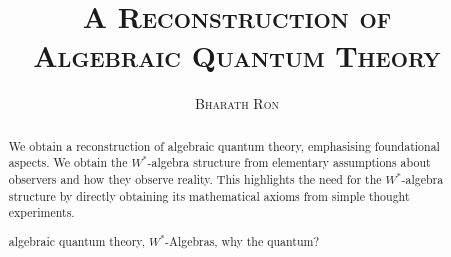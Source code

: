 \documentclass[11pt]{article}
\begin{document}
{\author{\textsc{Bharath Ron}}
\title{{{\LARGE \bfseries \textsc{A Reconstruction of}}\\\vspace{0em}\huge\bfseries\textsc{{Algebraic Quantum Theory}}}\\\vspace{0em}}}
\date{}
\maketitle
\vspace{2em}
\begin{adjustwidth}{3em}{3em}
\begin{abstract}
\vspace{.25em}
\noindent We obtain a reconstruction of algebraic quantum theory, emphasising foundational aspects. We obtain the $W^*$-algebra structure from elementary assumptions about observers and how they observe reality. This highlights the need for the $W^*$-algebra structure by directly obtaining its mathematical axioms from simple thought experiments.\\\par

 algebraic quantum theory, $W^*$-Algebras, why the quantum?
\end{abstract}
\end{adjustwidth}
\end{document}
